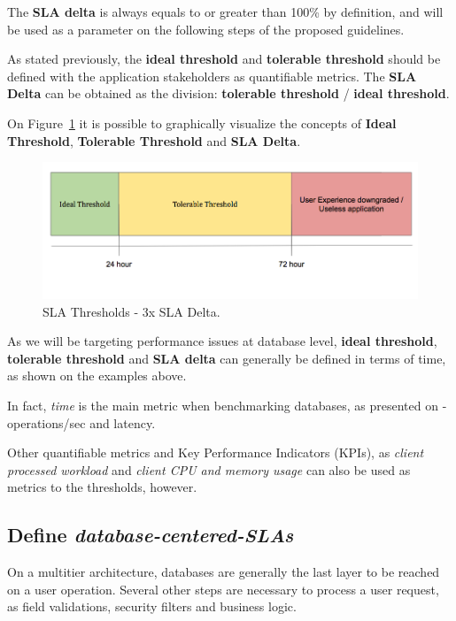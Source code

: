 The \textbf{SLA delta} is always equals to or greater than 100\% by definition, and will be used as a parameter on the following steps of the proposed guidelines.

As stated previously, the \textbf{ideal threshold} and \textbf{tolerable threshold} should be defined with the application stakeholders as quantifiable metrics. The \textbf{SLA Delta} can be obtained as the division: \textbf{tolerable threshold} / \textbf{ideal threshold}.

On Figure~\ref{fig:thresholds} it is possible to graphically visualize the concepts of \textbf{Ideal Threshold}, \textbf{Tolerable Threshold} and \textbf{SLA Delta}.

\begin{figure}[ht!]
\centering
\includegraphics[width=120mm]{Imagens/thresholds.png}
\caption{SLA Thresholds - 3x SLA Delta. \label{fig:thresholds}}
\end{figure}

As we will be targeting performance issues at database level, \textbf{ideal threshold}, \textbf{tolerable threshold} and \textbf{SLA delta} can generally be defined in terms of time, as shown on the examples above. 

In fact, \textit{time} is the main metric when benchmarking databases, as presented on \cite{datastaxbenchmark} - operations/sec and latency. 

Other quantifiable metrics and Key Performance Indicators (KPIs), as \textit{ client processed workload} and \textit{client CPU and memory usage} can also be used as metrics to the thresholds, however. 


\subsection{Define \textbf{\textit{database-centered-SLAs}}}

On a multitier architecture, databases are generally the last layer to be reached on a user operation. Several other steps are necessary to process a user request, as field validations, security filters and business logic.

